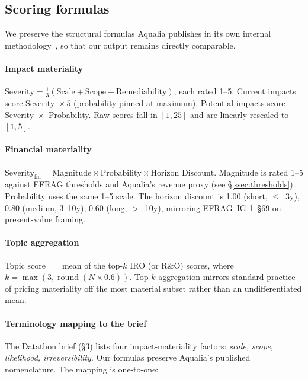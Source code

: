 \documentclass[11pt, a4paper]{article}
\begin{document}
\subsection{Scoring formulas}
\label{ssec:formulas}

We preserve the structural formulas Aqualia publishes in its own internal methodology~\cite{aqualiaMethodology2025}, so that our output remains directly comparable.

\paragraph{Impact materiality}
$\text{Severity} = \tfrac{1}{3}\!\left(\text{Scale} + \text{Scope} + \text{Remediability}\right)$, each rated 1--5. Current impacts score Severity~$\times\,5$ (probability pinned at maximum). Potential impacts score Severity~$\times$~Probability. Raw scores fall in $[1,25]$ and are linearly rescaled to $[1,5]$.

\paragraph{Financial materiality}
$\text{Severity}_{\text{fin}} = \text{Magnitude} \times \text{Probability} \times \text{Horizon Discount}$. Magnitude is rated 1--5 against EFRAG thresholds and Aqualia's revenue proxy (see \S\ref{ssec:thresholds}). Probability uses the same 1--5 scale. The horizon discount is 1.00 (short, $\leq$~3y), 0.80 (medium, 3--10y), 0.60 (long, $>$~10y), mirroring EFRAG~IG-1~\S 69 on present-value framing.

\paragraph{Topic aggregation}
Topic score $=$ mean of the top-$k$ IRO (or R\&O) scores, where $k = \max(3,\operatorname{round}(N \times 0.6))$. Top-$k$ aggregation mirrors standard practice of pricing materiality off the most material subset rather than an undifferentiated mean.

\paragraph{Terminology mapping to the brief}
The Datathon brief (\S 3) lists four impact-materiality factors: \emph{scale, scope, likelihood, irreversibility}. Our formulas preserve Aqualia's published nomenclature. The mapping is one-to-one:
\end{document}
